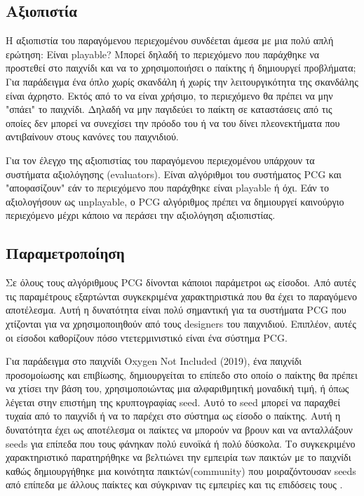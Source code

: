 \subsection{Αξιοπιστία} H αξιοπιστία του παραγόμενου περιεχομένου συνδέεται άμεσα με μια πολύ απλή ερώτηση: Είναι playable? Μπορεί δηλαδή το περιεχόμενο που παράχθηκε να προστεθεί στο παιχνίδι και να το χρησιμοποιήσει ο παίκτης ή δημιουργεί προβλήματα; Για παράδειγμα ένα όπλο χωρίς σκανδάλη ή χωρίς την λειτουργικότητα της σκανδάλης είναι άχρηστο. Εκτός από το να είναι χρήσιμο, το περιεχόμενο θα πρέπει να μην "σπάει" το παιχνίδι. Δηλαδή να μην παγιδεύει το παίκτη σε καταστάσεις από τις οποίες δεν μπορεί να συνεχίσει την πρόοδο του ή να του δίνει πλεονεκτήματα που αντιβαίνουν στους κανόνες του παιχνιδιού.
\par
Για τον έλεγχο της αξιοπιστίας του παραγόμενου περιεχομένου υπάρχουν τα συστήματα αξιολόγησης (evaluators). Είναι αλγόριθμοι του συστήματος PCG και "αποφασίζουν" εάν το περιεχόμενο που παράχθηκε είναι playable ή όχι. Εάν το αξιολογήσουν ως unplayable, ο PCG αλγόριθμος πρέπει να δημιουργεί καινούργιο περιεχόμενο μέχρι κάποιο να περάσει την αξιολόγηση αξιοπιστίας.

\subsection{Παραμετροποίηση} Σε όλους τους αλγόριθμους PCG δίνονται κάποιοι παράμετροι ως είσοδοι. Από αυτές τις παραμέτρους εξαρτώνται συγκεκριμένα χαρακτηριστικά που θα έχει το παραγόμενο αποτέλεσμα. Αυτή η δυνατότητα είναι πολύ σημαντική για τα συστήματα PCG που χτίζονται για να χρησιμοποιηθούν από τους designers του παιχνιδιού. Επιπλέον, αυτές οι είσοδοι καθορίζουν πόσο ντετερμινιστικό είναι ένα σύστημα PCG.
\par
Για παράδειγμα στο παιχνίδι Oxygen Not Included (2019), ένα παιχνίδι προσομοίωσης και επιβίωσης, δημιουργείται το επίπεδο στο οποίο ο παίκτης θα πρέπει να χτίσει την βάση του, χρησιμοποιώντας μια αλφαριθμητική μοναδική τιμή, ή όπως λέγεται στην επιστήμη της κρυπτογραφίας seed. Αυτό το seed μπορεί να παραχθεί τυχαία από το παιχνίδι ή να το παρέχει στο σύστημα ως είσοδο ο παίκτης. Αυτή η δυνατότητα έχει ως αποτέλεσμα οι παίκτες να μπορούν να βρουν και να ανταλλάξουν seeds για επίπεδα που τους φάνηκαν πολύ ευνοϊκά ή πολύ δύσκολα. Το συγκεκριμένο χαρακτηριστικό παρατηρήθηκε να βελτιώνει την εμπειρία των παικτών με το παιχνίδι καθώς δημιουργήθηκε μια κοινότητα παικτών(community) που μοιραζόντουσαν seeds από επίπεδα με άλλους παίκτες και σύγκριναν τις εμπειρίες και τις επιδόσεις τους \cite{oxygennotincluded}.

